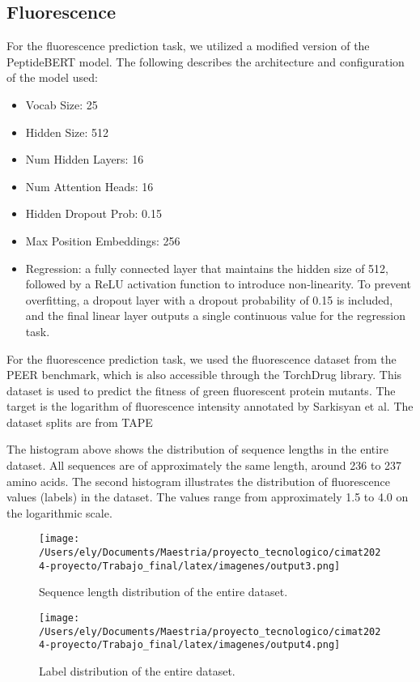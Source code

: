 \documentclass[letterpaper,spanish,reprint,nofootinbib,showkeys,aps]{revtex4-2}
\begin{document}
\subsection*{Fluorescence}
For the fluorescence prediction task, we utilized a modified version of the PeptideBERT model. The following describes the architecture and configuration of the model used:


\begin{itemize}
   \item Vocab Size: 25
\item Hidden Size: 512
\item Num Hidden Layers: 16
\item Num Attention Heads: 16
\item Hidden Dropout Prob: 0.15
\item Max Position Embeddings: 256
\item Regression:  a fully connected layer that maintains the hidden size of 512, followed by a ReLU activation function to introduce non-linearity. To prevent overfitting, a dropout layer with a dropout probability of 0.15 is included, and the final linear layer outputs a single continuous value for the regression task.
\end{itemize}

For the fluorescence prediction task, we used the fluorescence dataset from the PEER benchmark, which is also accessible through the TorchDrug library. This dataset is used to predict the fitness of green fluorescent protein mutants. The target is the logarithm of fluorescence intensity annotated by Sarkisyan et al. The dataset splits are from TAPE \cite{TAPE}

The histogram above shows the distribution of sequence lengths in the entire dataset. All sequences are of approximately the same length, around 236 to 237 amino acids. 
The second histogram illustrates the distribution of fluorescence values (labels) in the dataset. The values range from approximately 1.5 to 4.0 on the logarithmic scale.

\begin{figure} [H]
	\begin{center}
		\texttt{[image: /Users/ely/Documents/Maestria/proyecto\_tecnologico/cimat2024-proyecto/Trabajo\_final/latex/imagenes/output3.png]}
		\caption{Sequence length distribution of the entire dataset.}
   \end{center} 
\end{figure}


\begin{figure} [H]
	\begin{center}
		\texttt{[image: /Users/ely/Documents/Maestria/proyecto\_tecnologico/cimat2024-proyecto/Trabajo\_final/latex/imagenes/output4.png]}
		\caption{Label distribution of the entire dataset.} 
   \end{center} 
\end{figure}
\end{document}
